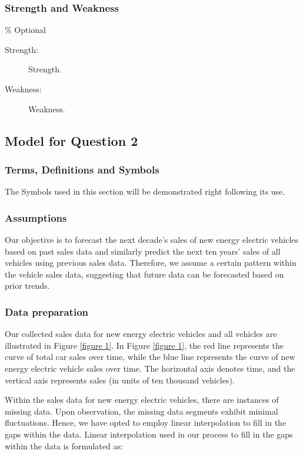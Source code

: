 \documentclass{apmcmthesis}
\begin{document}
\subsubsection{Strength and Weakness}
\% Optional
\begin{description}
\item[Strength:] Strength.
\item[Weakness:] Weakness.
\end{description}


\subsection{Model for Question 2}

\subsubsection{Terms, Definitions and Symbols}

The Symbols used in this section will be demonstrated right following its use.

\subsubsection{Assumptions}

Our objective is to forecast the next decade's sales of new energy electric vehicles based on past sales data and similarly predict the next ten years' sales of all vehicles using previous sales data. Therefore, we assume a certain pattern within the vehicle sales data, suggesting that future data can be forecasted based on prior trends.

\subsubsection{Data preparation}

Our collected sales data for new energy electric vehicles and all vehicles are illustrated in Figure \ref{figure 1}. In Figure \ref{figure 1}, the red line represents the curve of total car sales over time, while the blue line represents the curve of new energy electric vehicle sales over time. The horizontal axis denotes time, and the vertical axis represents sales (in units of ten thousand vehicles).

Within the sales data for new energy electric vehicles, there are instances of missing data. Upon observation, the missing data segments exhibit minimal fluctuations. Hence, we have opted to employ linear interpolation to fill in the gaps within the data. Linear interpolation used in our process to fill in the gaps within the data is formulated as:
\end{document}
